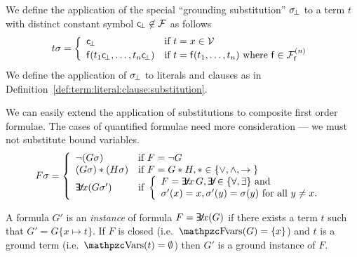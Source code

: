 \begin{definition}\label{def:grounding:substitution}
	We define the application of the special “grounding substitution” \( \subsbot \) to a term \( t \) with distinct constant symbol \( \consbot \not\in\mcF \)
	as follows
	\begin{gather*}
	\MDEFINE{t\sigma}{ll}{
			\consbot & \text{if }t=x\in\mcV
			\\
			\mf(t_1\consbot,\ldots,t_n\consbot)	&\text{if }t=\mf(t_1,\ldots,t_n)
			\text{ where  }
			 \mf\in\mcFfn
			 }
	\end{gather*}
	We define the application of \( \subsbot \) to literals and clauses as in
	Definition~\vref{def:term:literal:clause:substitution}.
\end{definition}

\begin{definition}
	We can easily extend the application of substitutions
	to composite first order formulae.
	The cases of quantified formulae need more consideration ---
	we must not substitute bound variables.
	\begin{gather*}
	\MDEFINE{F\sigma}{ll}{
		\lnot(G\sigma) & \text{if }F = \lnot G
		\\
		(G\sigma) \connect (H\sigma) & \text{if }F = G * H,
		\connect\in\SetOfConnectives
		\\
		\quantify x (G\sigma')
		&
		\text{if }
		\left\{  %
			\begin{array}{l}
				F = \quantify x\,G,
				\quantify\in\SetOfQuantifiers
				\text{ and}
				\\
				\sigma'(x) = x, \sigma'(y) = \sigma(y)
				\text{ for all } y \neq x.
		\end{array}
		\right.
	}
	\end{gather*}
\end{definition}

\begin{definition}
	A formula \( G' \) is an \emph{instance} of formula \( F = \quantify x (G) \)
	if there exists a term \( t \) such that \( G' = G\{ x\mapsto t \} \).
	If \( F \) is closed (i.e.\ \( \fvar(G) = \{ x \} \)) %
	and \( t \) is a ground term (i.e.\ \( \var(t) = \emptyset \)) then %
	\( G' \) is a ground instance of \( F \).
\end{definition}

